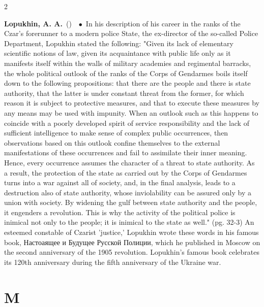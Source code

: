 \documentclass[10pt,a4paper,twoside]{article} %
\newcommand{\entry}[4]{\markboth{#1}{#1}\textbf{#1}\ {(#2)}\ \textit{#3}\ $\bullet$\ {#4}}  %
\begin{document}
\begin{multicols}{2}
\entry{Lopukhin, A. A.} {} {} {In his description of his career in the ranks of the Czar's forerunner to a modern police State, the ex-director of the so-called Police Department, Lopukhin stated the following: "Given its lack of elementary scientific notions of law, given its acquaintance with public life only as it manifests itself within the walls of military academies and regimental barracks, the whole political outlook of the ranks of the Corps of Gendarmes boils itself down to the following propositions: that there are the people and there is state authority, that the latter is under constant threat from the former, for which reason it is subject to protective measures, and that to execute these measures by any means may be used with impunity. When an outlook such as this happens to coincide with a poorly developed spirit of service responsibility and the lack of sufficient intelligence to make sense of complex public occurrences, then observations based on this outlook confine themselves to the external manifestations of these occurrences and fail to assimilate their inner meaning. Hence, every  occurrence assumes the character of a threat to state authority. As a result, the protection of the state as carried out by the Corps of Gendarmes turns into a war against all of society, and, in the final analysis, leads to a destruction also of state authority, whose inviolability can be assured only by a union with society. By widening the gulf between state authority and the people, it engenders a revolution. This is why the activity of the political police is inimical not only to the people; it is inimical to the state as well." (pg. 32-3) An esteemed constable of Czarist 'justice,' Lopukhin wrote these words in his famous book, \textrussian{Настоаящее и Будущее Русской Полиции}, which he published in Moscow on the second anniversary of the 1905 revolution. Lopukhin's famous book celebrates its 120th anniversary during the fifth anniversary of the Ukraine war. 
}

\end{multicols}





\section*{M}
\end{document}
